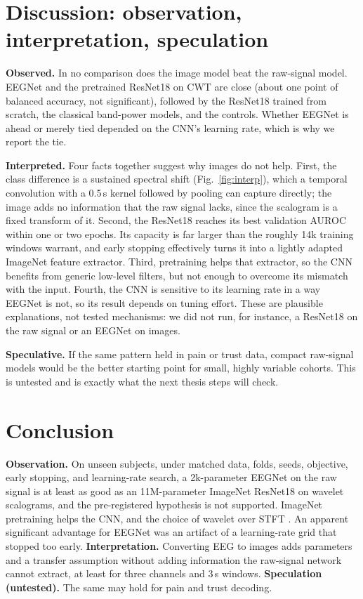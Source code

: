 \documentclass[conference]{IEEEtran}
\begin{document}
\section{Discussion: observation, interpretation, speculation}
\textbf{Observed.} In no comparison does the image model beat the raw-signal model. EEGNet and the pretrained ResNet18 on CWT are close (about one point of balanced accuracy, not significant), followed by the ResNet18 trained from scratch, the classical band-power models, and the controls. Whether EEGNet is ahead or merely tied depended on the CNN's learning rate, which is why we report the tie.

\textbf{Interpreted.} Four facts together suggest why images do not help. First, the class difference is a sustained spectral shift (Fig.~\ref{fig:interp}), which a temporal convolution with a 0.5\,s kernel followed by pooling can capture directly; the image adds no information that the raw signal lacks, since the scalogram is a fixed transform of it. Second, the ResNet18 reaches its best validation AUROC within one or two epochs. Its capacity is far larger than the roughly 14k training windows warrant, and early stopping effectively turns it into a lightly adapted ImageNet feature extractor. Third, pretraining helps that extractor, so the CNN benefits from generic low-level filters, but not enough to overcome its mismatch with the input. Fourth, the CNN is sensitive to its learning rate in a way EEGNet is not, so its result depends on tuning effort. These are plausible explanations, not tested mechanisms: we did not run, for instance, a ResNet18 on the raw signal or an EEGNet on images.

\textbf{Speculative.} If the same pattern held in pain or trust data, compact raw-signal models would be the better starting point for small, highly variable cohorts. This is untested and is exactly what the next thesis steps will check.

\section{Conclusion}
\textbf{Observation.} On unseen subjects, under matched data, folds, seeds, objective, early stopping, and learning-rate search, a 2k-parameter EEGNet on the raw signal is at least as good as an 11M-parameter ImageNet ResNet18 on wavelet scalograms, and the pre-registered hypothesis is not supported. ImageNet pretraining helps the CNN, and the choice of wavelet over STFT \stftShort{}. An apparent significant advantage for EEGNet was an artifact of a learning-rate grid that stopped too early. \textbf{Interpretation.} Converting EEG to images adds parameters and a transfer assumption without adding information the raw-signal network cannot extract, at least for three channels and 3\,s windows. \textbf{Speculation (untested).} The same may hold for pain and trust decoding.
\end{document}
